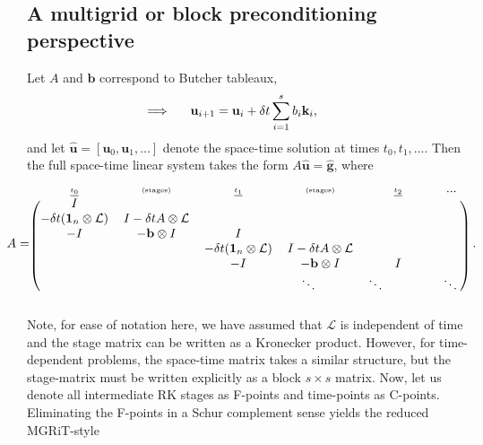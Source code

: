 \documentclass[a4paper,10pt]{article}
\begin{document}
\subsection{A multigrid or block preconditioning perspective}

Let $A$ and $\mathbf{b}$ correspond to Butcher tableaux,
%
\begin{align*}
\hspace{-6ex}\implies \hspace{3ex}\mathbf{u}_{i+1} & = \mathbf{u}_i + \delta t\sum_{i=1}^{s} b_i\mathbf{k}_i,
\end{align*}
%
and let $\hat{\mathbf{u}} = [\mathbf{u}_0, \mathbf{u}_1,...]$ denote the space-time solution
at times $t_0,t_1,...$. Then the full space-time linear system takes the form $A\hat{\mathbf{u}}
= \hat{\mathbf{g}}$, where
%
\begin{align*}
\hspace{-4ex}A = 
\begin{blockarray}{c c c c c c} \textnormal{\underline{\tiny{$t_0$}}} & \textnormal{\tiny(stages)} &
	\textnormal{\underline{\tiny{$t_1$}}} &  \textnormal{\tiny(stages)} & \textnormal{\underline{\tiny{$t_2$}}} & ... \\
\begin{block}{(c c c c c c)}
	I &  \\
	-\delta t(\mathbf{1}_n \otimes \mathcal{L}) & I - \delta t A\otimes \mathcal{L} &\\
	-I & -\mathbf{b}\otimes I & I \\ 
	& & -\delta t(\mathbf{1}_n \otimes \mathcal{L}) & I - \delta t A\otimes \mathcal{L} &  \\
	& & -I & -\mathbf{b}\otimes I & I \\
	&&& \ddots\text{\hspace{4ex}}  & \ddots\text{\hspace{8ex}}  & \ddots \\
	\end{block}
\end{blockarray}\hspace{1ex}.
\end{align*}
%
Note, for ease of notation here, we have assumed that $\mathcal{L}$ is independent of time
and the stage matrix can be written as a Kronecker product. However, for time-dependent
problems, the space-time matrix takes a similar structure, but the stage-matrix must be
written explicitly as a block $s\times s$ matrix. 
Now, let us denote all intermediate RK stages as F-points and time-points as C-points. 
Eliminating the F-points in a Schur complement sense yields the reduced MGRiT-style
\end{document}
